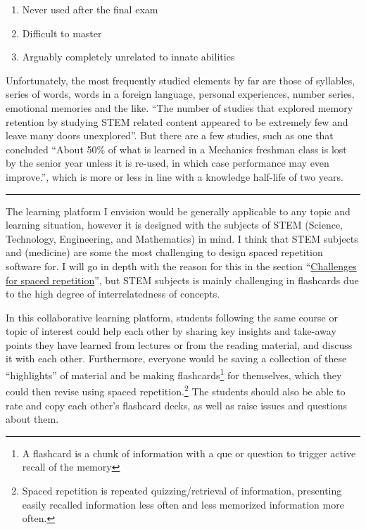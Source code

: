\begin{enumerate}
\def\labelenumi{\arabic{enumi}.}
\tightlist
\item
  Never used after the final exam
\item
  Difficult to master
\item
  Arguably completely unrelated to innate abilities
\end{enumerate}

Unfortunately, the most frequently studied elements by far are those of
syllables, series of words, words in a foreign language, personal
experiences, number series, emotional memories and the like. ``The
number of studies that explored memory retention by studying STEM
related content appeared to be extremely few and leave many doors
unexplored''. But there are a few studies, such as one that concluded
``About 50\% of what is learned in a Mechanics freshman class is lost by
the senior year unless it is re-used, in which case performance may even
improve.'', which is more or less in line with a knowledge half-life of
two years.

\begin{center}\rule{0.5\linewidth}{\linethickness}\end{center}

The learning platform I envision would be generally applicable to any
topic and learning situation, however it is designed with the subjects
of STEM (Science, Technology, Engineering, and Mathematics) in mind. I
think that STEM subjects and (medicine) are some the most challenging to
design spaced repetition software for. I will go in depth with the
reason for this in the section
``\protect\hyperlink{challenges-for-spaced-repetition}{Challenges for
spaced repetition}'', but STEM subjects is mainly challenging in
flashcards due to the high degree of interrelatedness of concepts.

In this collaborative learning platform, students following the same
course or topic of interest could help each other by sharing key
insights and take-away points they have learned from lectures or from
the reading material, and discuss it with each other. Furthermore,
everyone would be saving a collection of these ``highlights'' of
material and be making flashcards\footnote{A flashcard is a chunk of
  information with a que or question to trigger active recall of the
  memory} for themselves, which they could then revise using spaced
repetition.\footnote{Spaced repetition is repeated quizzing/retrieval of
  information, presenting easily recalled information less often and
  less memorized information more often.} The students should also be
able to rate and copy each other's flashcard decks, as well as raise
issues and questions about them.

